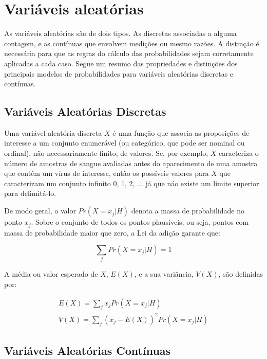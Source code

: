 \section{Variáveis aleatórias}

As variáveis aleatórias são de dois tipos. As discretas associadas a alguma contagem, e as contínuas que envolvem medições ou mesmo razões. A distinção é necessária para que as regras do cálculo das probabilidades sejam corretamente aplicadas a cada caso. Segue um resumo das propriedades e distinções dos principais modelos de probabilidades para variáveis aleatórias discretas e contínuas.

\subsection{Variáveis Aleatórias Discretas}

Uma variável aleatória discreta $X$ é uma função que associa as proposições de interesse a um conjunto enumerável (ou categórico, que pode ser nominal ou ordinal), não necessariamente finito, de valores. Se, por exemplo, $X$ caracteriza o número de amostras de sangue avaliadas antes do aparecimento de uma amostra que contém um vírus de interesse, então os possíveis valores para $X$ que caracterizam um conjunto infinito 0, 1, 2, ... já que náo existe um limite superior para delimitá-lo.

De modo geral, o valor $Pr(X = x_j | H)$ denota a massa de probabilidade no ponto $x_j$. Sobre o conjunto de todos os pontos plausíveis, ou seja, pontos com massa de probabilidade maior que zero, a Lei da adição garante que:

\begin{equation}
    \sum_{j}{Pr(X = x_j|H)} = 1
\end{equation}

A média ou valor esperado de $X$, $E(X)$, e a sua variância, $V(X)$, são definidas por:

\begin{equation}
\begin{split}
    E(X) = \sum_{j}{x_j Pr(X = x_j|H)} \\
    V(X) = \sum_{j}{(x_j - E(X))^2 Pr(X = x_j|H)}
\end{split}
\end{equation}

\subsection{Variáveis Aleatórias Contínuas}

